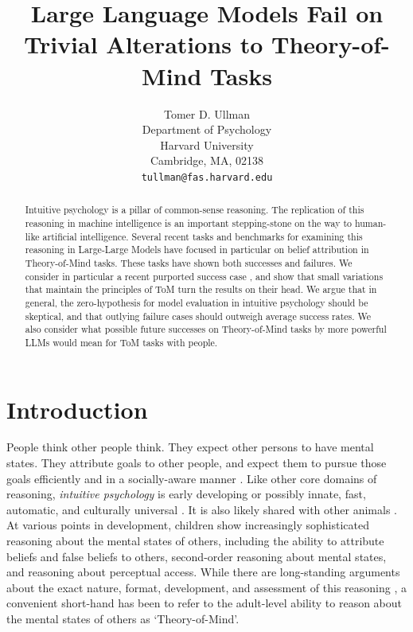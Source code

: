 \documentclass{article}
\title{Large Language Models Fail on Trivial Alterations to Theory-of-Mind Tasks}
\author{%
  Tomer D. Ullman \\
  Department of Psychology \\
  Harvard University \\
  Cambridge, MA, 02138 \\
  \texttt{tullman@fas.harvard.edu} \\
}
\begin{document}
\maketitle


\begin{abstract}
Intuitive psychology is a pillar of common-sense reasoning. The replication of this reasoning in machine intelligence is an important stepping-stone on the way to human-like artificial intelligence. Several recent tasks and benchmarks for examining this reasoning in Large-Large Models have focused in particular on belief attribution in Theory-of-Mind tasks. These tasks have shown both successes and failures. We consider in particular a recent purported success case \citep{kosinski2023theory}, and show that small variations that maintain the principles of ToM turn the results on their head. We argue that in general, the zero-hypothesis for model evaluation in intuitive psychology should be skeptical, and that outlying failure cases should outweigh average success rates. We also consider what possible future successes on Theory-of-Mind tasks by more powerful LLMs would mean for ToM tasks with people. 
\end{abstract}

\section{Introduction}

People think other people think. They expect other persons to have mental states. They attribute goals to other people, and expect them to pursue those goals efficiently and in a socially-aware manner \citep{liu2017six,gergely2003teleological}. Like other core domains of reasoning, \textit{intuitive psychology} is early developing or possibly innate, fast, automatic, and culturally universal \citep{spelke2007core}. It is also likely shared with other animals \citep{marticorena2011monkeys,vallortigara2012aristotle}. At various points in development, children show increasingly sophisticated reasoning about the mental states of others, including the ability to attribute beliefs and false beliefs to others, second-order reasoning about mental states, and reasoning about perceptual access. While there are long-standing arguments about the exact nature, format, development, and assessment of this reasoning \citep[see e.g][]{saxe2012happiness}, a convenient short-hand has been to refer to the adult-level ability to reason about the mental states of others as `Theory-of-Mind'.
\end{document}
